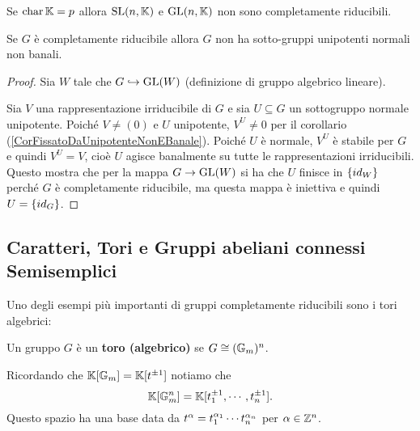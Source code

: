 \begin{exercise}
Se $\operatorname{char} \mathbb{K}=p$ allora $\operatorname{SL}(n,\mathbb{K})$ e $\operatorname{GL}(n,\mathbb{K})$ non sono completamente riducibili.
\end{exercise}




\begin{proposition}\label{PrCompletamenteRiducibileNonHaSottogruppiNormaliUnipotenti}
Se $G$ \`e completamente riducibile allora $G$ non ha sotto-gruppi unipotenti normali non banali.
\end{proposition}
\begin{proof}
Sia $W$ tale che $G\hookrightarrow \operatorname{GL}(W)$ (definizione di gruppo algebrico lineare).

Sia $V$ una rappresentazione irriducibile di $G$ e sia $U\subseteq G$ un sottogruppo normale unipotente. Poich\'e $V\neq (0)$ e $U$ unipotente, $V^U\neq 0$ per il corollario (\ref{CorFissatoDaUnipotenteNonEBanale}). Poich\'e $U$ \`e normale, $V^U$ \`e stabile per $G$ e quindi $V^U=V$, cio\`e $U$ agisce banalmente su tutte le rappresentazioni irriducibili. Questo mostra che per la mappa $G\to \operatorname{GL}(W)$ si ha che $U$ finisce in $\left\{ id_W\right\}$ perch\'e $G$ \`e completamente riducibile, ma questa mappa \`e iniettiva e quindi $U=\left\{ id_G\right\}$.
\end{proof}

\subsection{Caratteri, Tori e Gruppi abeliani connessi Semisemplici}


Uno degli esempi pi\`u importanti di gruppi completamente riducibili sono i tori algebrici:
\begin{definition}
Un gruppo $G$ \`e un \textbf{toro (algebrico)} se $G\cong (\mathbb{G}_m)^n$.
\end{definition}

\begin{remark}
Ricordando che $\mathbb{K}[\mathbb{G}_m]=\mathbb{K}[t^{\pm1}]$ notiamo che
\[\mathbb{K}[\mathbb{G}_m^n]=\mathbb{K}[t_1^{\pm1},\cdots,t_n^{\pm1}].\]
Questo spazio ha una base data da $t^\alpha=t_1^{\alpha_1}\cdots t_n^{\alpha_n}$ per $\alpha\in \mathbb{Z}^n$.
\end{remark}

